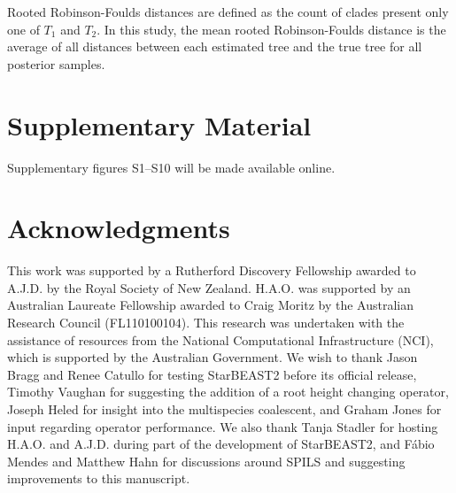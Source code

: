 \documentclass[nogrid]{MBE}%
\begin{document}
Rooted Robinson-Foulds distances \citep{ROBINSON1981131} are defined as the
count of clades present only one of $T_1$ and $T_2$. In this study, the mean
rooted Robinson-Foulds distance is the average of all distances between each
estimated tree and the true tree for all posterior samples.

\section{Supplementary Material}
Supplementary figures S1--S10 will be made available online.

\section{Acknowledgments}

This work was supported by a Rutherford Discovery Fellowship awarded to A.J.D.
by the Royal Society of New Zealand. H.A.O. was supported by an Australian
Laureate Fellowship awarded to Craig Moritz by the Australian Research Council
(FL110100104). This research was undertaken with the assistance of resources
from the National Computational Infrastructure (NCI), which is supported by the
Australian Government. We wish to thank Jason Bragg and Renee Catullo for
testing StarBEAST2 before its official release, Timothy Vaughan for suggesting
the addition of a root height changing operator, Joseph Heled for insight into
the multispecies coalescent, and Graham Jones for input regarding operator
performance. We also thank Tanja Stadler for hosting H.A.O. and A.J.D. during part of the
development of StarBEAST2, and F\'abio Mendes and Matthew Hahn for discussions around
SPILS and suggesting improvements to this manuscript.

\end{document}
